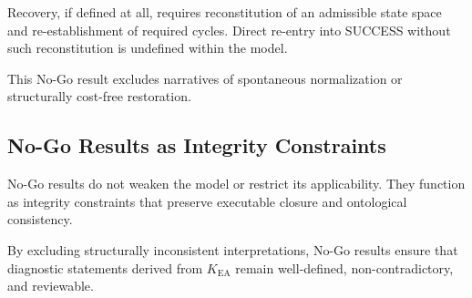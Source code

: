 Recovery, if defined at all, requires reconstitution of an admissible
state space and re-establishment of required cycles.
Direct re-entry into SUCCESS without such reconstitution is undefined
within the model.

This No-Go result excludes narratives of spontaneous normalization or
structurally cost-free restoration.

\subsection{No-Go Results as Integrity Constraints}

No-Go results do not weaken the model or restrict its applicability.
They function as integrity constraints that preserve executable closure
and ontological consistency.

By excluding structurally inconsistent interpretations, No-Go results
ensure that diagnostic statements derived from $K_{\mathrm{EA}}$ remain
well-defined, non-contradictory, and reviewable.

